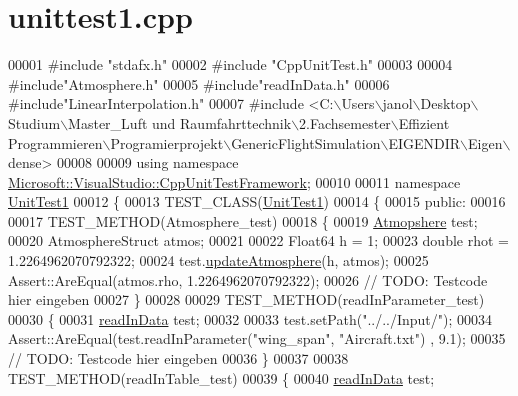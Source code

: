 \hypertarget{unittest1_8cpp_source}{}\section{unittest1.\+cpp}
\label{unittest1_8cpp_source}

\begin{DoxyCode}
00001 \textcolor{preprocessor}{#include "stdafx.h"}
00002 \textcolor{preprocessor}{#include "CppUnitTest.h"}
00003 
00004 \textcolor{preprocessor}{#include"Atmosphere.h"}
00005 \textcolor{preprocessor}{#include"readInData.h"}
00006 \textcolor{preprocessor}{#include"LinearInterpolation.h"}
00007 \textcolor{preprocessor}{#include <C:\(\backslash\)Users\(\backslash\)janol\(\backslash\)Desktop\(\backslash\)Studium\(\backslash\)Master\_Luft und Raumfahrttechnik\(\backslash\)2.Fachsemester\(\backslash\)Effizient
       Programmieren\(\backslash\)Programierprojekt\(\backslash\)GenericFlightSimulation\(\backslash\)EIGENDIR\(\backslash\)Eigen\(\backslash\)dense>}
00008 
00009 \textcolor{keyword}{using namespace }\hyperlink{namespace_microsoft_1_1_visual_studio_1_1_cpp_unit_test_framework}{Microsoft::VisualStudio::CppUnitTestFramework};
00010 
00011 \textcolor{keyword}{namespace }\hyperlink{namespace_unit_test1}{UnitTest1}
00012 \{       
00013     TEST\_CLASS(\hyperlink{namespace_unit_test1}{UnitTest1})
00014     \{
00015     \textcolor{keyword}{public}:
00016         
00017         TEST\_METHOD(Atmosphere\_test)
00018         \{
00019             \hyperlink{group___atmosphere_class_atmopshere}{Atmopshere} test;
00020             AtmosphereStruct atmos;
00021             
00022             Float64 h = 1;
00023             \textcolor{keywordtype}{double} rhot = 1.2264962070792322;
00024             test.\hyperlink{group___atmosphere_a2bd97471d32725d6196ee6816ea36c99}{updateAtmosphere}(h, atmos);
00025             Assert::AreEqual(atmos.rho, 1.2264962070792322);
00026             \textcolor{comment}{// TODO: Testcode hier eingeben}
00027         \}
00028 
00029         TEST\_METHOD(readInParameter\_test)
00030         \{
00031             \hyperlink{classread_in_data}{readInData} test;
00032             
00033             test.setPath(\textcolor{stringliteral}{"../../Input/"});
00034             Assert::AreEqual(test.readInParameter(\textcolor{stringliteral}{"wing\_span"}, \textcolor{stringliteral}{"Aircraft.txt"}) , 9.1);
00035             \textcolor{comment}{// TODO: Testcode hier eingeben}
00036         \}
00037 
00038         TEST\_METHOD(readInTable\_test)
00039         \{
00040             \hyperlink{classread_in_data}{readInData} test;

\end{DoxyCode}
